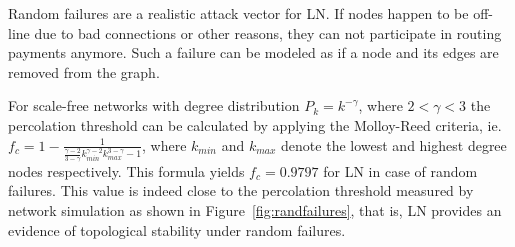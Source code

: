 \documentclass[a4paper]{article}
\theoremstyle{definition}
\begin{document}
Random failures are a realistic attack vector for LN. If nodes happen to be off-line due to bad connections or other reasons, they can not participate in routing payments anymore. Such a failure can be modeled as if a node and its edges are removed from the graph.    

For scale-free networks with degree distribution $P_{k}=k^{-\gamma}$, where $2 < \gamma < 3$ the percolation threshold can be calculated by applying the Molloy-Reed criteria, ie. $f_{c}=1-\frac{1}{\frac{\gamma-2}{3-\gamma}k_{min}^{\gamma-2}k_{max}^{3-\gamma}-1}$, where $k_{min}$ and $k_{max}$ denote the lowest and highest degree nodes respectively. This formula yields $f_c=0.9797$ for LN in case of random failures. This value is indeed close to the percolation threshold measured by network simulation as shown in Figure~\ref{fig:randfailures}, that is, LN provides an evidence of topological stability under random failures.

\newpage
\end{document}
